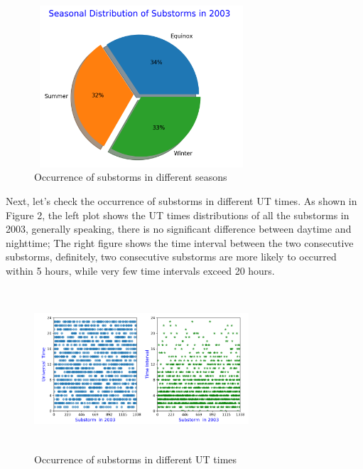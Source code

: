 \documentclass[12pt, letterpaper]{article} %
\begin{document}
\begin{figure}[!t] %
\begin{center} %
  \includegraphics[width=8cm,height=6cm]{seasonal_distribution.png} %
  \caption{Occurrence of substorms in different seasons} %
  \label{fig:1} %
\end{center} %
\end{figure} %

Next, let's check the occurrence of substorms in different UT times. As shown in Figure 2, the left plot shows the UT times distributions of all the substorms in 2003, generally speaking, there is no significant difference between daytime and nighttime; The right figure shows the time interval between the two consecutive substorms, definitely, two consecutive substorms are more likely to occurred within 5 hours, while very few time intervals exceed 20 hours.

\begin{figure}[!t] %
\begin{center} %
  \includegraphics[width=8cm,height=6cm]{Time Interval.png} %
  \caption{Occurrence of substorms in different UT times} %
  \label{fig:2} %
\end{center} %
\end{figure} %
\end{document}
